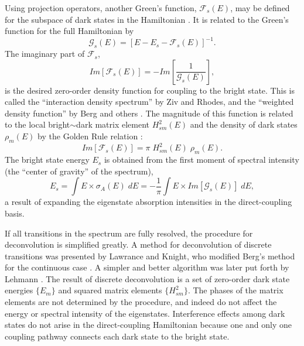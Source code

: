 \documentclass[12pt]{mitthesis}
\begin{document}
Using projection operators, another Green's function,
$\mathcal{F}_s(E)$, may be defined for the subspace of dark states in
the Hamiltonian \cite{ziv76, cable80}.  It is related to the Green's
function for the full Hamiltonian by
\begin{equation}
  \label{eq:green-subspace}
  \mathcal{G}_s(E) = [E - E_s - \mathcal{F}_s(E)]^{-1}.
\end{equation}
The imaginary part of $\mathcal{F}_s$,
\begin{equation}
  \label{eq:idf}
  Im[\mathcal{F}_s(E)] = - Im \left [
    \frac{1}{\mathcal{G}_s(E)}
  \right ], 
\end{equation}
is the desired zero-order density function for coupling to the bright
state.  This is called the ``interaction density spectrum'' by Ziv and
Rhodes, and the ``weighted density function'' by Berg and others
\cite{ziv76, berg76}.  The magnitude of this function is related to
the local bright$\sim$dark matrix element $H_{sm}^2(E)$ and the
density of dark states $\rho_m(E)$ by the Golden Rule relation \cite{berg76}:
\begin{equation}
  Im[\mathcal{F}_s(E)] = \pi \; H_{sm}^2(E) \; \rho_m(E).
\end{equation}
The bright state energy $E_s$ is obtained from the first moment of
spectral intensity (the ``center of gravity'' of the spectrum),
\begin{equation}
  \label{eq:bse-continuous}
  E_s = \int E \times \sigma_A (E) \; dE
  = - \frac{1}{\pi} \int E \times Im[\mathcal{G}_s(E)] \; dE,
\end{equation}
a result of expanding the eigenstate absorption intensities in the
direct-coupling basis.


If all transitions in the spectrum are fully resolved, the procedure
for deconvolution is simplified greatly.  A method for deconvolution
of discrete transitions was presented by Lawrance and Knight, who
modified Berg's method for the continuous case \cite{lawrance85,
  berg76}.  A simpler and better algorithm was later put forth by
Lehmann \cite{lehmann91}.  The result of discrete deconvolution is a
set of zero-order dark state energies $\lbrace E_m \rbrace$ and
squared matrix elements $\lbrace H_{sm}^2 \rbrace$.  The phases of the
matrix elements are not determined by the procedure, and indeed do not
affect the energy or spectral intensity of the eigenstates.
Interference effects among dark states do not arise in the
direct-coupling Hamiltonian because one and only one coupling pathway
connects each dark state to the bright state.
\end{document}
